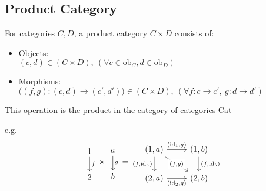 \subsection{Product Category}
For categories $C,D$, a product category $C\times D$ consists of:
\parencite{awodey:category_theory}
\begin{itemize}
  \item Objects:\\
    $(c, d) \in (C\times D)
      ,\ (\forall c \in \mathrm{ob}_C, d \in \mathrm{ob}_D)$
  \item Morphisms:\\
    $\big((f,g) : (c,d) \to (c', d')\big)\in(C\times D)
      ,\ (\forall f: c \to c',\ g:d \to d')$
\end{itemize}
This operation is the product in the category of categories Cat

e.g.
\[
  \begin{tikzcd}
    1 \\
    2
    \arrow["f", from=1-1, to=2-1]
  \end{tikzcd}
  \times
  \begin{tikzcd}
    a \\
    b
    \arrow["g", from=1-1, to=2-1]
  \end{tikzcd}
  =
  \begin{tikzcd}
    {(1,a)} & {(1,b)} \\
    {(2,a)} & {(2,b)}
    \arrow["{(\mathrm{id}_1,g)}", from=1-1, to=1-2]
    \arrow["{(f,\mathrm{id}_a)}"', from=1-1, to=2-1]
    \arrow["{(\mathrm{id}_2,g)}"', from=2-1, to=2-2]
    \arrow["{(f,\mathrm{id}_b)}", from=1-2, to=2-2]
    \arrow["{(f,g)}"{description}, from=1-1, to=2-2]
  \end{tikzcd}
\]